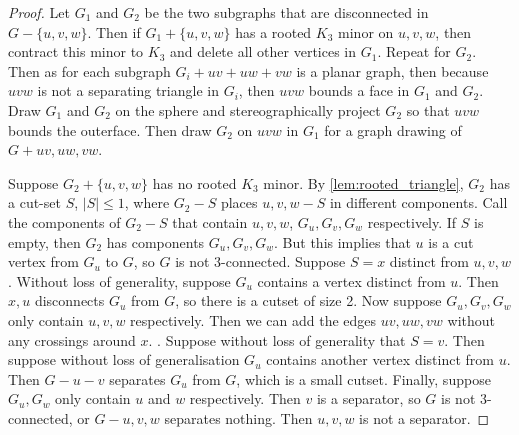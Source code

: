 \begin{proof}
	Let $G_1$ and $G_2$ be the two subgraphs that are disconnected in $G - \{u,v,w\}$. Then if $G_1 + \{u,v,w\}$ has a rooted $K_3$ minor on $u,v,w$, then contract this minor to $K_3$ and delete all other vertices in $G_1$. Repeat for $G_2$. Then as for each subgraph $G_i + uv + uw + vw$ is a planar graph, then because $uvw$ is not a separating triangle in $G_i$, then $uvw$ bounds a face in $G_1$ and $G_2$. Draw $G_1$ and $G_2$ on the sphere and stereographically project $G_2$ so that $uvw$ bounds the outerface. Then draw $G_2$ on $uvw$ in $G_1$ for a graph drawing of $G + uv, uw, vw$. 
	
	Suppose $G_2 + \{u,v,w\}$ has no rooted $K_3$ minor. By \cref{lem:rooted_triangle}, $G_2$ has a cut-set $S$, $|S| \leq 1$, where $G_2 - S$ places $u,v,w - S$ in different components. Call the components of $G_2 - S$ that contain $u,v,w$, $G_u, G_v, G_w$ respectively. If $S$ is empty, then $G_2$ has components $G_u, G_v, G_w$. But this implies that $u$ is a cut vertex from $G_u$ to $G$, so $G$ is not $3$-connected. Suppose $S = x$ distinct from $u,v,w$. Without loss of generality, suppose $G_u$ contains a vertex distinct from $u$. Then $x, u$ disconnects $G_u$ from $G$, so there is a cutset of size 2. Now suppose $G_u, G_v, G_w$ only contain $u,v,w$ respectively. Then we can add the edges $uv, uw, vw$ without any crossings around $x$. . Suppose without loss of generality that $S = v$. Then suppose without loss of generalisation $G_u$ contains another vertex distinct from $u$. Then $G - u - v$ separates $G_u$ from $G$, which is a small cutset. Finally, suppose $G_u, G_w$ only contain $u$ and $w$ respectively. Then $v$ is a separator, so $G$ is not $3$-connected, or $G - u,v,w$ separates nothing. Then $u,v,w$ is not a separator. 
\end{proof}

